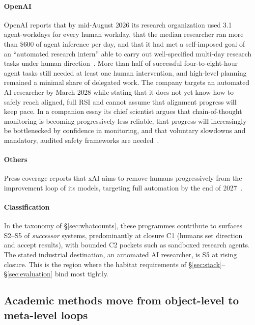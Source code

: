 \documentclass[11pt,a4paper]{article}
\begin{document}
\paragraph{OpenAI} OpenAI reports that by mid-August 2026 its research organization used 3.1 agent-workdays for every human workday, that the median researcher ran more than \$600 of agent inference per day, and that it had met a self-imposed goal of an ``automated research intern'' able to carry out well-specified multi-day research tasks under human direction~\cite{openai-accel}. More than half of successful four-to-eight-hour agent tasks still needed at least one human intervention, and high-level planning remained a minimal share of delegated work. The company targets an automated AI researcher by March 2028 while stating that it does not yet know how to safely reach aligned, full RSI and cannot assume that alignment progress will keep pace. In a companion essay its chief scientist argues that chain-of-thought monitoring is becoming progressively less reliable, that progress will increasingly be bottlenecked by confidence in monitoring, and that voluntary slowdowns and mandatory, audited safety frameworks are needed~\cite{pachocki}.

\paragraph{Others} Press coverage reports that xAI aims to remove humans progressively from the improvement loop of its models, targeting full automation by the end of 2027~\cite{ap}.

\paragraph{Classification} In the taxonomy of \S\ref{sec:whatcounts}, these programmes contribute to surfaces S2--S5 of \emph{successor} systems, predominantly at closure C1 (humans set direction and accept results), with bounded C2 pockets such as sandboxed research agents. The stated industrial destination, an automated AI researcher, is S5 at rising closure. This is the region where the habitat requirements of \S\ref{sec:stack}--\S\ref{sec:evaluation} bind most tightly.

\subsection{Academic methods move from object-level to meta-level loops}\label{sec:academic}
\end{document}
